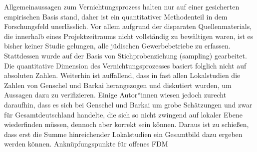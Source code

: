 Allgemeinaussagen zum Vernichtungsprozess halten nur auf einer gesicherten empirischen Basis stand, daher ist ein quantitativer Methodenteil in dem Forschungsfeld unerlässlich. Vor allem aufgrund der disparaten Quellenmaterials, die innerhalb eines Projektzeitraums nicht vollständig zu bewältigen waren, ist es bisher keiner Studie gelungen, alle jüdischen Gewerbebetriebe zu erfassen. Stattdessen wurde auf der Basis von Stichprobenziehung (sampling) gearbeitet. Die quantitative Dimension des Vernichtungsprozesses basiert folglich nicht auf absoluten Zahlen.
Weiterhin ist auffallend, dass in fast allen Lokalstudien die Zahlen von Genschel und Barkai herangezogen und diskutiert wurden, um Aussagen dazu zu verifizieren. Einige Autor*innen wiesen jedoch zurecht daraufhin, dass es sich bei Genschel und Barkai um grobe Schätzungen und zwar für Gesamtdeutschland handelte, die sich so nicht zwingend auf lokaler Ebene wiederfinden müssen, dennoch aber korrekt sein können. Daraus ist zu schießen, dass erst die Summe hinreichender Lokalstudien ein Gesamtbild dazu ergeben werden können.
Anknüpfungspunkte für offenes FDM